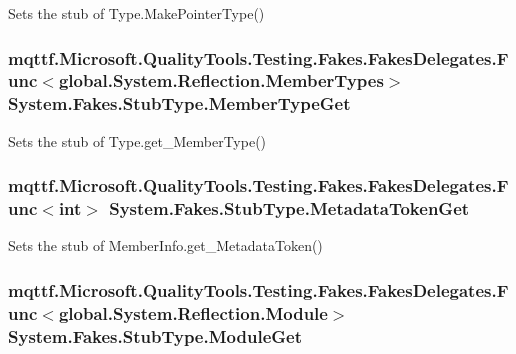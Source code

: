 Sets the stub of Type.\-Make\-Pointer\-Type()

\hypertarget{class_system_1_1_fakes_1_1_stub_type_a1ea09642c2ded9161bb458b03dccbde6}{
\subsubsection[{Member\-Type\-Get}]{\setlength{\rightskip}{0pt plus 5cm}mqttf.\-Microsoft.\-Quality\-Tools.\-Testing.\-Fakes.\-Fakes\-Delegates.\-Func$<$global.\-System.\-Reflection.\-Member\-Types$>$ System.\-Fakes.\-Stub\-Type.\-Member\-Type\-Get}}\label{class_system_1_1_fakes_1_1_stub_type_a1ea09642c2ded9161bb458b03dccbde6}


Sets the stub of Type.\-get\-\_\-\-Member\-Type()

\hypertarget{class_system_1_1_fakes_1_1_stub_type_aae8dffa488dc21d1a2435a0f8208b3c7}{
\subsubsection[{Metadata\-Token\-Get}]{\setlength{\rightskip}{0pt plus 5cm}mqttf.\-Microsoft.\-Quality\-Tools.\-Testing.\-Fakes.\-Fakes\-Delegates.\-Func$<$int$>$ System.\-Fakes.\-Stub\-Type.\-Metadata\-Token\-Get}}\label{class_system_1_1_fakes_1_1_stub_type_aae8dffa488dc21d1a2435a0f8208b3c7}


Sets the stub of Member\-Info.\-get\-\_\-\-Metadata\-Token()

\hypertarget{class_system_1_1_fakes_1_1_stub_type_aaa400e484087b525912b125116acde44}{
\subsubsection[{Module\-Get}]{\setlength{\rightskip}{0pt plus 5cm}mqttf.\-Microsoft.\-Quality\-Tools.\-Testing.\-Fakes.\-Fakes\-Delegates.\-Func$<$global.\-System.\-Reflection.\-Module$>$ System.\-Fakes.\-Stub\-Type.\-Module\-Get}}\label{class_system_1_1_fakes_1_1_stub_type_aaa400e484087b525912b125116acde44}



